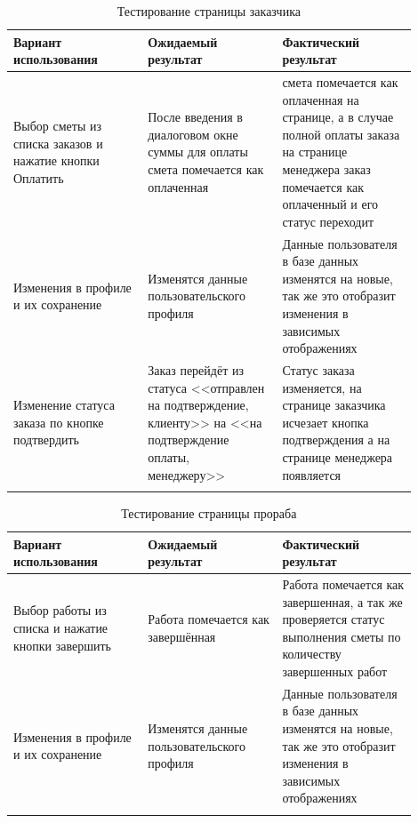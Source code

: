 \begin{center}
	\begin{longtable}{|p{0.3\linewidth}|p{0.3\linewidth}|p{0.3\linewidth}|}
		\hline
		\textbf{Вариант использования} & \textbf{Ожидаемый результат}&
		\textbf{Фактический результат}\\
		\hline
		Выбор сметы из списка заказов и нажатие кнопки Оплатить & После введения в диалоговом окне суммы для оплаты смета помечается как оплаченная & смета помечается как оплаченная на странице, а в случае полной оплаты заказа на странице менеджера заказ помечается как оплаченный и его статус переходит\\
		\hline
		Изменения в профиле и их сохранение  & Изменятся данные пользовательского профиля & Данные пользователя в базе данных изменятся на новые, так же это отобразит изменения в зависимых отображениях \\
		\hline
		Изменение статуса заказа по кнопке подтвердить & Заказ перейдёт из статуса <<отправлен на подтверждение, клиенту>> на <<на подтверждение оплаты, менеджеру>> & Статус заказа изменяется, на странице заказчика исчезает кнопка подтверждения а на странице менеджера появляется \\
		\hline
		\caption{Тестирование страницы заказчика}\\
	\end{longtable}
\end{center}


\begin{center}
	\begin{longtable}{|p{0.3\linewidth}|p{0.3\linewidth}|p{0.3\linewidth}|}
		\hline
		\textbf{Вариант использования} & \textbf{Ожидаемый результат}&
		\textbf{Фактический результат}\\
		\hline
		Выбор работы из списка и нажатие кнопки завершить & Работа помечается как завершённая & Работа помечается как завершенная, а так же проверяется статус выполнения сметы по количеству завершенных работ\\
		\hline
		Изменения в профиле и их сохранение  & Изменятся данные пользовательского профиля & Данные пользователя в базе данных изменятся на новые, так же это отобразит изменения в зависимых отображениях \\
		\hline
		\caption{Тестирование страницы прораба}\\
	\end{longtable}
\end{center}

